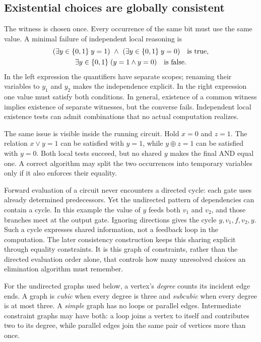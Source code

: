 \subsection{Existential choices are globally consistent}

The witness is chosen once. Every occurrence of the same bit must use the
same value. A minimal failure of independent local reasoning is
\[
 \begin{gathered}
 (\exists y\in\{0,1\}\;y=1)\ \land\ (\exists y\in\{0,1\}\;y=0)
       \quad\text{is true},\\
 \exists y\in\{0,1\}\;(y=1\land y=0)
       \quad\text{is false}.
 \end{gathered}
\]
In the left expression the quantifiers have separate scopes; renaming
their variables to $y_1$ and $y_2$ makes the independence explicit.
In the right expression one value must satisfy both conditions. In general,
existence of a common witness implies existence of separate witnesses,
but the converse fails. Independent local existence tests can admit
combinations that no actual computation realizes.

The same issue is visible inside the running circuit. Hold $x=0$ and
$z=1$. The relation $x\lor y=1$ can be satisfied with $y=1$, while
$y\oplus z=1$ can be satisfied with $y=0$. Both local tests succeed,
but no shared $y$ makes the final AND equal one. A correct algorithm may
split the two occurrences into temporary variables only if it also enforces
their equality.

Forward evaluation of a circuit never encounters a directed cycle: each
gate uses already determined predecessors. Yet the undirected pattern of
dependencies can contain a cycle. In this example the value of $y$ feeds
both $v_1$ and $v_2$, and those branches meet at the output gate. Ignoring
directions gives the cycle $y,v_1,f,v_2,y$. Such a cycle expresses shared
information, not a feedback loop in the computation. The later consistency
construction keeps this sharing explicit through equality constraints.
It is this graph of constraints, rather than the directed evaluation order
alone, that controls how many unresolved choices an elimination algorithm
must remember.

For the undirected graphs used below, a vertex's \emph{degree} counts its
incident edge ends. A graph is \emph{cubic} when every degree is three and
\emph{subcubic} when every degree is at most three. A \emph{simple} graph
has no loops or parallel edges. Intermediate constraint graphs may have
both: a loop joins a vertex to itself and contributes two to its degree,
while parallel edges join the same pair of vertices more than once.

